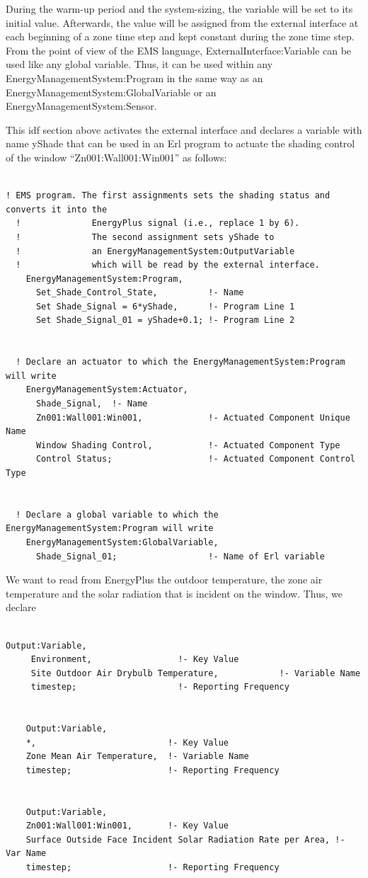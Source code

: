 During the warm-up period and the system-sizing, the variable will be set to its initial value. Afterwards, the value will be assigned from the external interface at each beginning of a zone time step and kept constant during the zone time step. From the point of view of the EMS language, ExternalInterface:Variable can be used like any global variable. Thus, it can be used within any EnergyManagementSystem:Program in the same way as an EnergyManagementSystem:GlobalVariable or an EnergyManagementSystem:Sensor.

This idf section above activates the external interface and declares a variable with name yShade that can be used in an Erl program to actuate the shading control of the window ``Zn001:Wall001:Win001'' as follows:

\begin{lstlisting}

! EMS program. The first assignments sets the shading status and converts it into the
  !              EnergyPlus signal (i.e., replace 1 by 6).
  !              The second assignment sets yShade to
  !              an EnergyManagementSystem:OutputVariable
  !              which will be read by the external interface.
    EnergyManagementSystem:Program,
      Set_Shade_Control_State,          !- Name
      Set Shade_Signal = 6*yShade,      !- Program Line 1
      Set Shade_Signal_01 = yShade+0.1; !- Program Line 2


  ! Declare an actuator to which the EnergyManagementSystem:Program will write
    EnergyManagementSystem:Actuator,
      Shade_Signal,  !- Name
      Zn001:Wall001:Win001,             !- Actuated Component Unique Name
      Window Shading Control,           !- Actuated Component Type
      Control Status;                   !- Actuated Component Control Type


  ! Declare a global variable to which the EnergyManagementSystem:Program will write
    EnergyManagementSystem:GlobalVariable,
      Shade_Signal_01;                  !- Name of Erl variable
\end{lstlisting}

We want to read from EnergyPlus the outdoor temperature, the zone air temperature and the solar radiation that is incident on the window. Thus, we declare

\begin{lstlisting}

Output:Variable,
     Environment,                 !- Key Value
     Site Outdoor Air Drybulb Temperature,            !- Variable Name
     timestep;                    !- Reporting Frequency


    Output:Variable,
    *,                          !- Key Value
    Zone Mean Air Temperature,  !- Variable Name
    timestep;                   !- Reporting Frequency


    Output:Variable,
    Zn001:Wall001:Win001,       !- Key Value
    Surface Outside Face Incident Solar Radiation Rate per Area, !- Var Name
    timestep;                   !- Reporting Frequency
\end{lstlisting}

